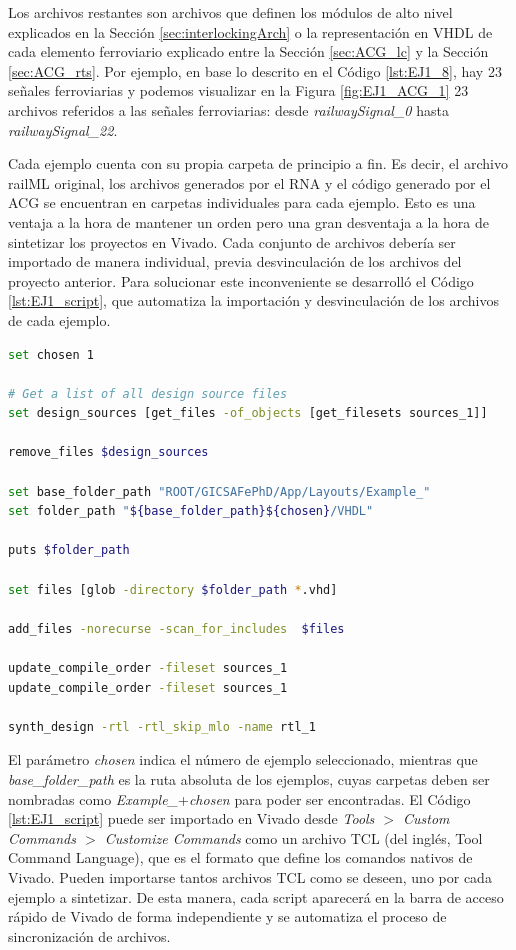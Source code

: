 	Los archivos restantes son archivos que definen los módulos de alto nivel explicados en la Sección \ref{sec:interlockingArch} o la representación en VHDL de cada elemento ferroviario explicado entre la Sección \ref{sec:ACG_lc} y la Sección \ref{sec:ACG_rts}. Por ejemplo, en base lo descrito en el Código \ref{lst:EJ1_8}, hay 23 señales ferroviarias y podemos visualizar en la Figura \ref{fig:EJ1_ACG_1} 23 archivos referidos a las señales ferroviarias: desde \textit{railwaySignal\_0} hasta \textit{railwaySignal\_22}.
	
	Cada ejemplo cuenta con su propia carpeta de principio a fin. Es decir, el archivo railML original, los archivos generados por el RNA y el código generado por el ACG se encuentran en carpetas individuales para cada ejemplo. Esto es una ventaja a la hora de mantener un orden pero una gran desventaja a la hora de sintetizar los proyectos en Vivado. Cada conjunto de archivos debería ser importado de manera individual, previa desvinculación de los archivos del proyecto anterior. Para solucionar este inconveniente se desarrolló el Código \ref{lst:EJ1_script}, que automatiza la importación y desvinculación de los archivos de cada ejemplo.
	
	
	\begin{lstlisting}[language = {bash}, caption = script.tcl, label = {lst:EJ1_script}]
set chosen 1

# Get a list of all design source files
set design_sources [get_files -of_objects [get_filesets sources_1]]

remove_files $design_sources

set base_folder_path "ROOT/GICSAFePhD/App/Layouts/Example_"
set folder_path "${base_folder_path}${chosen}/VHDL"

puts $folder_path

set files [glob -directory $folder_path *.vhd]

add_files -norecurse -scan_for_includes  $files

update_compile_order -fileset sources_1
update_compile_order -fileset sources_1

synth_design -rtl -rtl_skip_mlo -name rtl_1
	\end{lstlisting}
	
	El parámetro \textit{chosen} indica el número de ejemplo seleccionado, mientras que \textit{base\_folder\_path} es la ruta absoluta de los ejemplos, cuyas carpetas deben ser nombradas como \textit{Example\_}+\textit{chosen} para poder ser encontradas. El Código \ref{lst:EJ1_script} puede ser importado en Vivado desde \textit{Tools $>$ Custom Commands $>$ Customize Commands} como un archivo TCL (del inglés, Tool Command Language), que es el formato que define los comandos nativos de Vivado. Pueden importarse tantos archivos TCL como se deseen, uno por cada ejemplo a sintetizar. De esta manera, cada script aparecerá en la barra de acceso rápido de Vivado de forma independiente y se automatiza el proceso de sincronización de archivos.
	
